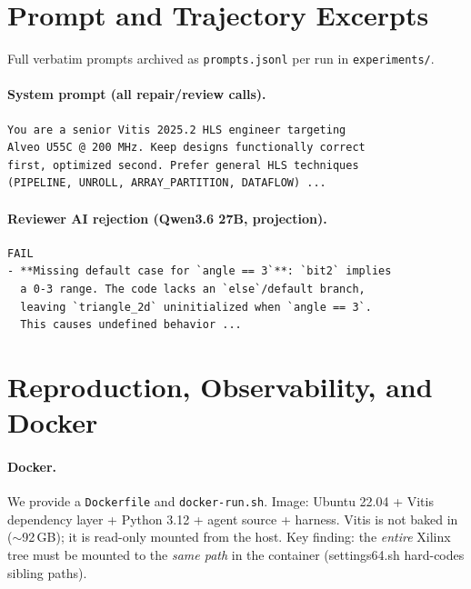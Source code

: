 \documentclass[10pt,conference,letterpaper]{IEEEtran}
\begin{document}
\section{Prompt and Trajectory Excerpts}
\label{app:prompts}

Full verbatim prompts archived as \texttt{prompts.jsonl} per run in \texttt{experiments/}.

\paragraph{System prompt (all repair/review calls).}
\begin{footnotesize}
\begin{verbatim}
You are a senior Vitis 2025.2 HLS engineer targeting
Alveo U55C @ 200 MHz. Keep designs functionally correct
first, optimized second. Prefer general HLS techniques
(PIPELINE, UNROLL, ARRAY_PARTITION, DATAFLOW) ...
\end{verbatim}
\end{footnotesize}

\paragraph{Reviewer AI rejection (Qwen3.6 27B, projection).}
\begin{footnotesize}
\begin{verbatim}
FAIL
- **Missing default case for `angle == 3`**: `bit2` implies
  a 0-3 range. The code lacks an `else`/default branch,
  leaving `triangle_2d` uninitialized when `angle == 3`.
  This causes undefined behavior ...
\end{verbatim}
\end{footnotesize}

\section{Reproduction, Observability, and Docker}
\label{app:repro}

\paragraph{Docker.} We provide a \texttt{Dockerfile} and \texttt{docker-run.sh}. Image: Ubuntu 22.04 + Vitis dependency layer + Python 3.12 + agent source + harness. Vitis is not baked in ($\sim$92\,GB); it is read-only mounted from the host. Key finding: the \emph{entire} Xilinx tree must be mounted to the \emph{same path} in the container (settings64.sh hard-codes sibling paths).
\end{document}
